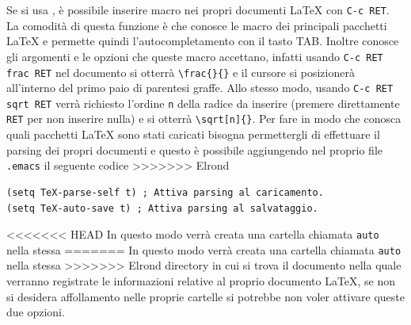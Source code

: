 \documentclass[11pt,a4paper]{article}
\begin{document}
Se si usa \auctex{},
è possibile inserire macro nei propri documenti \LaTeX{}
con \verb!C-c RET!.  La comodità di questa funzione è che \auctex{}
conosce le macro dei principali pacchetti \LaTeX{}
e permette quindi l'autocompletamento con il tasto TAB.  Inoltre conosce gli
argomenti e le opzioni che queste macro accettano, infatti usando
\verb!C-c RET frac RET! nel documento si otterrà \verb!\frac{}{}!
e il cursore si posizionerà all'interno del primo paio di parentesi graffe.
Allo stesso modo, usando \verb!C-c RET sqrt RET! verrà richiesto l'ordine
\verb!n! della radice da inserire (premere direttamente \verb!RET! per non
inserire nulla) e si otterrà \verb!\sqrt[n]{}!.  Per fare in modo che \auctex{}
conosca quali pacchetti \LaTeX{} sono stati caricati bisogna permettergli di
effettuare il parsing dei propri documenti e questo è possibile aggiungendo nel
proprio file \verb!.emacs! il seguente codice
>>>>>>> Elrond
\begin{Verbatim}
(setq TeX-parse-self t) ; Attiva parsing al caricamento.
(setq TeX-auto-save t) ; Attiva parsing al salvataggio.
\end{Verbatim}
<<<<<<< HEAD
In questo modo verrà creata una cartella chiamata \texttt{auto} nella stessa
=======
In questo modo verrà creata una cartella chiamata \verb!auto! nella stessa
>>>>>>> Elrond
directory in cui si trova il documento nella quale verranno registrate le
informazioni relative al proprio documento \LaTeX{},
se non si desidera affollamento nelle proprie cartelle si potrebbe non voler
attivare queste due opzioni.
\end{document}
